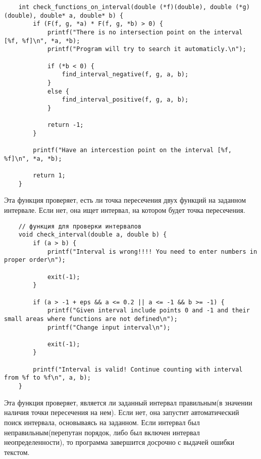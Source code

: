 \documentclass[a4paper,12pt,titlepage,finall]{article}
\begin{document}
\begin{verbatim}
    int check_functions_on_interval(double (*f)(double), double (*g)(double), double* a, double* b) {
        if (F(f, g, *a) * F(f, g, *b) > 0) {
            printf("There is no intersection point on the interval [%f, %f]\n", *a, *b);
            printf("Program will try to search it automaticly.\n");

            if (*b < 0) {
                find_interval_negative(f, g, a, b);
            }
            else {
                find_interval_positive(f, g, a, b);
            }

            return -1;
        }

        printf("Have an intercestion point on the interval [%f, %f]\n", *a, *b);

        return 1;
    }
\end{verbatim}
Эта функция проверяет, есть ли точка пересечения двух функций на заданном интервале. 
Если нет, она ищет интервал, на котором будет точка пересечения.

\begin{verbatim}
    // функция для проверки интервалов
    void check_interval(double a, double b) {
        if (a > b) {
            printf("Interval is wrong!!!! You need to enter numbers in proper order\n");
    
            exit(-1);
        }
    
        if (a > -1 + eps && a <= 0.2 || a <= -1 && b >= -1) {
            printf("Given interval include points 0 and -1 and their small areas where functions are not defined\n");
            printf("Change input interval\n");
    
            exit(-1);
        }
    
        printf("Interval is valid! Continue counting with interval from %f to %f\n", a, b);
    }
\end{verbatim}
Эта функция проверяет, является ли заданный интервал правильным(в значении наличия точки пересечения на нем). 
Если нет, она запустит автоматический поиск интервала, основываясь на заданном.
Если интервал был неправильным(перепутан порядок, либо был включен интервал неопределенности), то программа завершится досрочно с выдачей ошибки текстом.
\end{document}
